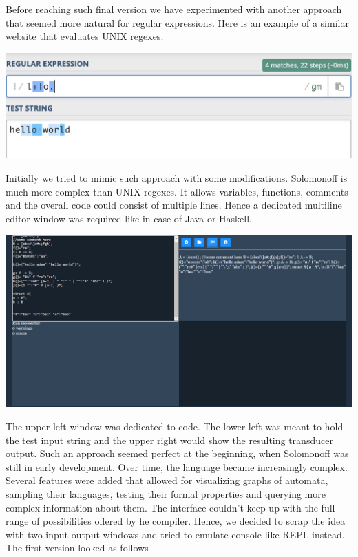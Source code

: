 Before reaching such final version we have experimented with another approach that seemed more natural for regular expressions. Here is an example of a similar website that evaluates UNIX regexes.
\begin{center}
     \includegraphics[scale=0.65]{regex.png}
\end{center}
Initially we tried to mimic such approach with some modifications. Solomonoff is much more complex than UNIX regexes. It allows variables, functions, comments and the overall code could consist of multiple lines. Hence a dedicated multiline editor window was required like in case of Java or Haskell.
\begin{center}
     \includegraphics[scale=0.2]{web3.png}
\end{center}
The upper left window was dedicated to code. The lower left was meant to hold the test input string and the upper right would show the resulting transducer output. Such an approach seemed perfect at the beginning, when Solomonoff was still in early development. Over time, the language became increasingly complex. Several features were added that allowed for visualizing graphs of automata, sampling their languages, testing their formal properties and querying more complex information about them. The interface couldn't keep up with the full range of possibilities offered by he compiler. Hence, we decided to scrap the idea with two input-output windows and tried to emulate console-like REPL instead. The first version looked as follows
